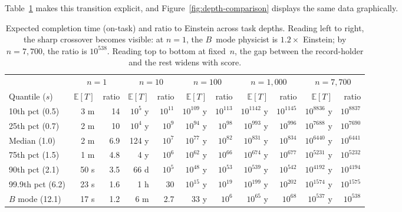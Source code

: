 \documentclass{article}
\begin{document}
Table~\ref{tab:depth-comparison} makes this transition explicit, and
Figure~\ref{fig:depth-comparison} displays the same data graphically.

\begin{table}[ht]
  \centering
  \caption{Expected completion time (on-task) and ratio to Einstein
           across task depths. Reading left to right, the sharp crossover becomes visible: at $n = 1$, the $B$~mode
           physicist is $1.2\times$ Einstein; by $n = 7{,}700$, the
           ratio is $10^{538}$. Reading top to bottom at fixed~$n$,
           the gap between the record-holder and the rest widens with
           score.}
  \label{tab:depth-comparison}
  \medskip
  \small
  \begin{tabular}{l r r r r r r r r r r}
    \hline
    & \multicolumn{2}{c}{$n = 1$}
    & \multicolumn{2}{c}{$n = 10$}
    & \multicolumn{2}{c}{$n = 100$}
    & \multicolumn{2}{c}{$n = 1{,}000$}
    & \multicolumn{2}{c}{$n = 7{,}700$} \\
    Quantile ($s$)
    & $\mathbb{E}[T]$ & ratio
    & $\mathbb{E}[T]$ & ratio
    & $\mathbb{E}[T]$ & ratio
    & $\mathbb{E}[T]$ & ratio
    & $\mathbb{E}[T]$ & ratio \\
    \hline
    10th pct (0.5)
    & 3 m & 14
    & $10^5$ y & $10^{11}$
    & $10^{109}$ y & $10^{113}$
    & $10^{1142}$ y & $10^{1145}$
    & $10^{8836}$ y & $10^{8837}$ \\
    25th pct (0.7)
    & 2 m & 10
    & $10^4$ y & $10^{9}$
    & $10^{94}$ y & $10^{98}$
    & $10^{993}$ y & $10^{996}$
    & $10^{7688}$ y & $10^{7690}$ \\
    Median (1.0)
    & 2 m & 6.9
    & 124 y & $10^{7}$
    & $10^{77}$ y & $10^{82}$
    & $10^{831}$ y & $10^{834}$
    & $10^{6440}$ y & $10^{6441}$ \\
    75th pct (1.5)
    & 1 m & 4.8
    & 4 y & $10^{6}$
    & $10^{62}$ y & $10^{66}$
    & $10^{674}$ y & $10^{677}$
    & $10^{5231}$ y & $10^{5232}$ \\
    90th pct (2.1)
    & 50 s & 3.5
    & 66 d & $10^{5}$
    & $10^{48}$ y & $10^{53}$
    & $10^{539}$ y & $10^{542}$
    & $10^{4192}$ y & $10^{4194}$ \\
    99.9th pct (6.2)
    & 23 s & 1.6
    & 1 h & 30
    & $10^{15}$ y & $10^{19}$
    & $10^{199}$ y & $10^{202}$
    & $10^{1574}$ y & $10^{1575}$ \\
    $B$ mode (12.1)
    & 17 s & 1.2
    & 6 m & 2.7
    & 33 y & $10^{6}$
    & $10^{65}$ y & $10^{68}$
    & $10^{537}$ y & $10^{538}$ \\

\end{tabular}
\end{table}
\end{document}
